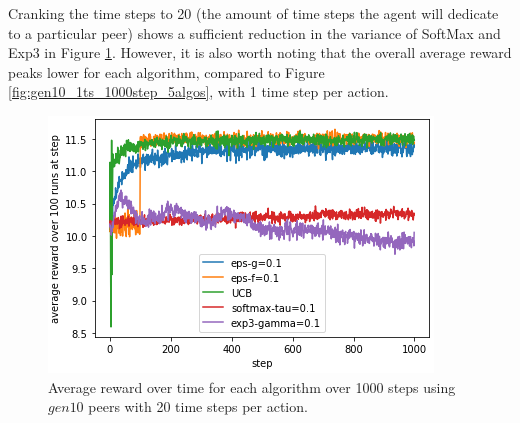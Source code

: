 \documentclass{article}
\begin{document}
Cranking the time steps to 20 (the amount of time steps the agent will dedicate to a particular peer) shows a sufficient reduction in the variance of SoftMax and Exp3 in 
Figure \ref{fig:gen10_20ts_1000step_5algos}. However, it is also worth noting that the overall average reward peaks lower for each algorithm, compared to 
Figure \ref{fig:gen10_1ts_1000step_5algos}, with 1 time step per action.
\begin{figure}[h]
    \centering
    \includegraphics[width=1\linewidth]{figs/gen10_20ts_1000step_5algos.png}
    \caption{Average reward over time for each algorithm over 1000 steps using $gen10$ peers with 20 time steps per action.}
    \label{fig:gen10_20ts_1000step_5algos}
\end{figure}

\end{document}
